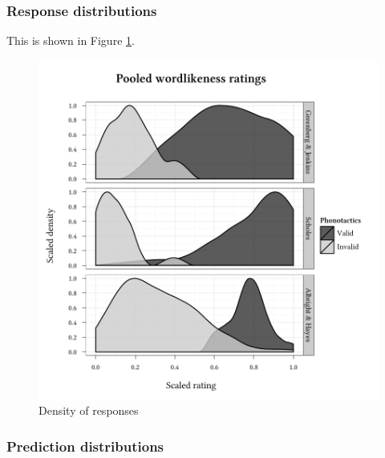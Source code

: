 
\subsubsection{Response distributions}

This is shown in Figure \ref{density}.

\begin{figure}
\centering
\includegraphics{density.pdf}
\caption{Density of responses}
\label{density}
\end{figure}

\subsubsection{Prediction distributions}

\citet{Coltheart1977}

\citet{Hayes2008a}
\citet{Albright2009}



